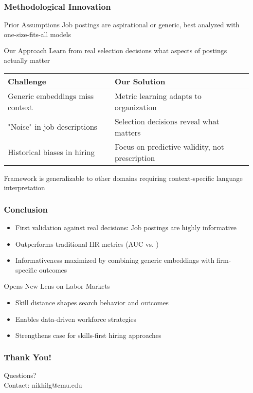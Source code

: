 \documentclass[aspectratio=169]{beamer}
\begin{document}
\begin{frame}
\frametitle{Methodological Innovation}

\begin{block}{Prior Assumptions}
Job postings are aspirational or generic, best analyzed with one-size-fits-all models
\end{block}

\begin{block}{Our Approach}
Learn from real selection decisions what aspects of postings actually matter
\end{block}
\vspace{1em}

\begin{center}
\begin{tabular}{|l|l|}
\hline
\textbf{Challenge} & \textbf{Our Solution} \\
\hline
Generic embeddings miss context & Metric learning adapts to organization \\
"Noise" in job descriptions & Selection decisions reveal what matters \\
Historical biases in hiring & Focus on predictive validity, not prescription \\
\hline
\end{tabular}
\end{center}
\vspace{1em}

Framework is generalizable to other domains requiring
context-specific language interpretation
\end{frame}

\begin{frame}
\frametitle{Conclusion}

\begin{itemize}
\item First validation against real decisions: Job postings are highly informative
\item Outperforms traditional HR metrics (AUC  vs. )
\item Informativeness maximized by combining generic embeddings with firm-specific outcomes
\end{itemize}

\begin{block}{Opens New Lens on Labor Markets}
\begin{itemize}
\item Skill distance shapes search behavior and outcomes
\item Enables data-driven workforce strategies
\item Strengthens case for skills-first hiring approaches
\end{itemize}
\end{block}

\begin{center}
\end{center}
\end{frame}

\begin{frame}
\frametitle{Thank You!}
\begin{center}
\LARGE Questions?\\
\vspace{1cm}
\normalsize
Contact: nikhilg@cmu.edu
\end{center}
\end{frame}
\end{document}
